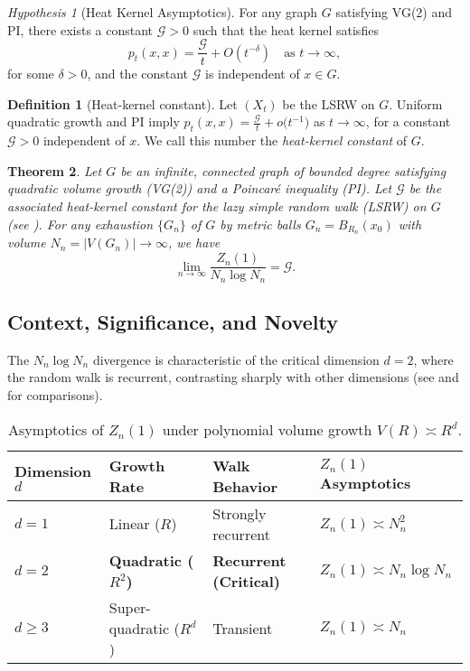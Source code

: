 \documentclass[12pt]{amsart}
\newtheorem{theorem}{Theorem}[section]
\theoremstyle{definition}
\newtheorem{definition}[theorem]{Definition}
\theoremstyle{remark}
\newcommand{\cG}{\mathcal{G}}    %
\newtheorem{hypothesis}{Hypothesis}[section]
\begin{document}
\begin{hypothesis}[Heat Kernel Asymptotics]\label{hyp:HK}
For any graph \( G \) satisfying VG(2) and PI, there exists a constant \( \mathcal{G} > 0 \) such that the heat kernel satisfies
	\[
	p_t(x,x) = \frac{\mathcal{G}}{t} + O(t^{-\delta}) \quad \text{as } t \to \infty,
	\]
for some \( \delta > 0 \), and the constant \( \mathcal{G} \) is independent of \( x \in G \).
\end{hypothesis}

\begin{definition}[Heat-kernel constant]\label{def:G}
Let $(X_t)$ be the LSRW on $G$. Uniform quadratic growth and PI imply
\(
    p_t(x,x)=\frac{\cG}{t}+o\!\bigl(t^{-1}\bigr)
\)
as $t\to\infty$, for a constant $\cG>0$ independent of $x$. We call this number the \emph{heat-kernel constant} of $G$.
\end{definition}

\begin{theorem}\label{thm:main}
Let $G$ be an infinite, connected graph of bounded degree satisfying quadratic volume growth (VG(2)) and a Poincaré inequality (PI). Let $\cG$ be the associated heat-kernel constant for the lazy simple random walk (LSRW) on $G$ (see ). For any exhaustion $\{G_n\}$ of $G$ by metric balls $G_n = B_{R_n}(x_0)$ with volume $N_n = |V(G_n)| \to \infty$, we have
\[
\lim_{n \to \infty} \frac{Z_n(1)}{N_n \log N_n} = \cG.
\]
\end{theorem}

\subsection{Context, Significance, and Novelty}
The $N_n \log N_n$ divergence is characteristic of the critical dimension $d=2$, where the random walk is recurrent, contrasting sharply with other dimensions (see  and  for comparisons).

\begin{table}[h!]
\centering
\caption{Asymptotics of $Z_n(1)$ under polynomial volume growth $V(R) \asymp R^d$.}
\label{tab:growth}
\begin{tabular}{@{}llll@{}}
\toprule
\textbf{Dimension} $d$ & \textbf{Growth Rate} & \textbf{Walk Behavior} & $Z_n(1)$ \textbf{Asymptotics} \\
\midrule
$d=1$ & Linear ($R$) & Strongly recurrent & $Z_n(1) \asymp N_n^2$ \\
\textbf{$d=2$} & \textbf{Quadratic ($R^2$)} & \textbf{Recurrent (Critical)} & $Z_n(1) \asymp N_n \log N_n$ \\
$d\geq 3$ & Super-quadratic ($R^d$) & Transient & $Z_n(1) \asymp N_n$ \\
\bottomrule
\end{tabular}
\end{table}
\end{document}
